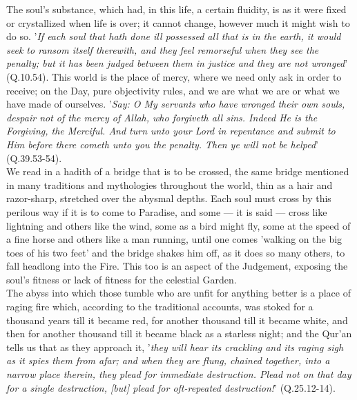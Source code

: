 \documentclass[10pt, twoside,openright]{book}
\begin{document}
The soul's substance, which had, in this life, a certain fluidity, is as it were fixed or 
crystallized when life is over; it cannot change, however much it might wish to do so. '\emph{If each soul 
that hath done ill possessed all that is in the earth, it would seek to ransom itself therewith, and 
they feel remorseful when they see the penalty; but it has been judged between them in justice and 
they are not wronged}' (Q.10.54). This world is the place of mercy, where we need only ask in order to 
receive; on the Day, pure objectivity rules, and we are what we are or what we have made of 
ourselves. '\emph{Say: O My servants who have wronged their own souls, despair not of the mercy of Allah, 
who forgiveth all sins. Indeed He is the Forgiving, the Merciful. And turn unto your Lord in 
repentance and submit to Him before there cometh unto you the penalty. Then ye will not be 
helped}' (Q.39.53-54). \\

We read in a hadith of a bridge that is to be crossed, the same bridge mentioned in many traditions 
and mythologies throughout the world, thin as a hair and razor\hyp{}sharp, stretched over the abysmal 
depths. Each soul must cross by this perilous way if it is to come to Paradise, and some --- it is said 
--- cross like lightning and others like the wind, some as a bird might fly, some at the speed of a 
fine horse and others like a man running, until one comes 'walking on the big toes of his two feet' 
and the bridge shakes him off, as it does so many others, to fall headlong into the Fire. This too is 
an aspect of the Judgement, exposing the soul's fitness or lack of fitness for the celestial Garden. \\

The abyss into which those tumble who are unfit for anything better is a place of raging fire which, 
according to the traditional accounts, was stoked for a thousand years till it became red, for 
another thousand till it became white, and then for another thousand till it became black as a 
starless night; and the Qur'an tells us that as they approach it, '\emph{they will hear its crackling and 
its raging sigh as it spies them from afar; and when they are flung, chained together, into a narrow 
place therein, they plead for immediate destruction. Plead not on that day for a single destruction, 
[but] plead for oft\hyp{}repeated destruction!}' (Q.25.12\hyp{}14). \\
\end{document}
